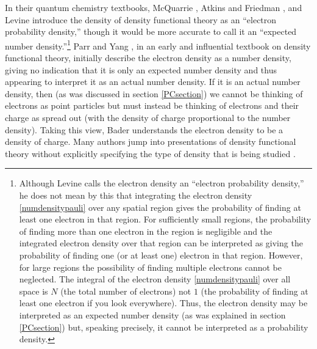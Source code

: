 \documentclass[12pt,onecolumn,secnumarabic,amsmath,amssymb,balancelastpage,nofootinbib]{article}
\begin{document}
In their quantum chemistry textbooks, McQuarrie \cite[pg.\ 649--650]{mcquarrieQC}, Atkins and Friedman \cite[pg.\ 317]{atkins2011}, and Levine \cite[sec.\ 16.5]{levineQC} introduce the density of density functional theory as an ``electron probability density,'' though it would be more accurate to call it an ``expected number density.''\footnote{Although Levine \cite[sec.\ 16.5]{levineQC}  calls the electron density an ``electron probability density,'' he does not mean by this that integrating the electron density \eqref{numdensitypauli} over any spatial region gives the probability of finding at least one electron in that region.  For sufficiently small regions, the probability of finding more than one electron in the region is negligible and the integrated electron density over that region can be interpreted as giving the probability of finding one (or at least one) electron in that region.  However, for large regions the possibility of finding multiple electrons cannot be neglected.  The integral of the electron density \eqref{numdensitypauli} over all space is $N$ (the total number of electrons) not $1$ (the probability of finding at least one electron if you look everywhere).  Thus, the electron density may be interpreted as an expected number density (as was explained in section \ref{PCsection}) but, speaking precisely, it cannot be interpreted as a probability density.}  Parr and Yang \cite[pg.\ 14]{parryang}, in an early and influential textbook on density functional theory, initially describe the electron density as a number density, giving no indication that it is only an expected number density and thus appearing to interpret it as an actual number density.  If it is an actual number density, then (as was discussed in section \ref{PCsection}) we cannot be thinking of electrons as point particles but must instead be thinking of electrons and their charge as spread out (with the density of charge proportional to the number density).  Taking this view, Bader \cite{bader2010} understands the electron density to be a density of charge.  Many authors jump into presentations of density functional theory without explicitly specifying the type of density that is being studied \cite{seminario1995, martin2004, engel2011, becke2014}.

\end{document}
